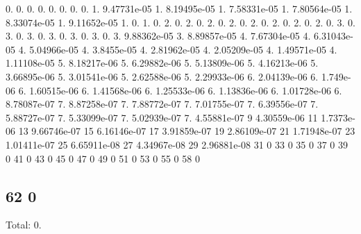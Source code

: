 0. 0. 0. 0. 0. 0. 0. 0. 1. 9.\+47731e-\/05 1. 8.\+19495e-\/05 1. 7.\+58331e-\/05 1. 7.\+80564e-\/05 1. 8.\+33074e-\/05 1. 9.\+11652e-\/05 1. 0. 1. 0. 2. 0. 2. 0. 2. 0. 2. 0. 2. 0. 2. 0. 2. 0. 2. 0. 3. 0. 3. 0. 3. 0. 3. 0. 3. 0. 3. 0. 3. 9.\+88362e-\/05 3. 8.\+89857e-\/05 4. 7.\+67304e-\/05 4. 6.\+31043e-\/05 4. 5.\+04966e-\/05 4. 3.\+8455e-\/05 4. 2.\+81962e-\/05 4. 2.\+05209e-\/05 4. 1.\+49571e-\/05 4. 1.\+11108e-\/05 5. 8.\+18217e-\/06 5. 6.\+29882e-\/06 5. 5.\+13809e-\/06 5. 4.\+16213e-\/06 5. 3.\+66895e-\/06 5. 3.\+01541e-\/06 5. 2.\+62588e-\/06 5. 2.\+29933e-\/06 6. 2.\+04139e-\/06 6. 1.\+749e-\/06 6. 1.\+60515e-\/06 6. 1.\+41568e-\/06 6. 1.\+25533e-\/06 6. 1.\+13836e-\/06 6. 1.\+01728e-\/06 6. 8.\+78087e-\/07 7. 8.\+87258e-\/07 7. 7.\+88772e-\/07 7. 7.\+01755e-\/07 7. 6.\+39556e-\/07 7. 5.\+88727e-\/07 7. 5.\+33099e-\/07 7. 5.\+02939e-\/07 7. 4.\+55881e-\/07 9 4.\+30559e-\/06 11 1.\+7373e-\/06 13 9.\+66746e-\/07 15 6.\+16146e-\/07 17 3.\+91859e-\/07 19 2.\+86109e-\/07 21 1.\+71948e-\/07 23 1.\+01411e-\/07 25 6.\+65911e-\/08 27 4.\+34967e-\/08 29 2.\+96881e-\/08 31 0 33 0 35 0 37 0 39 0 41 0 43 0 45 0 47 0 49 0 51 0 53 0 55 0 58 0 \subsection*{62 0 }

Total\+: 0. 